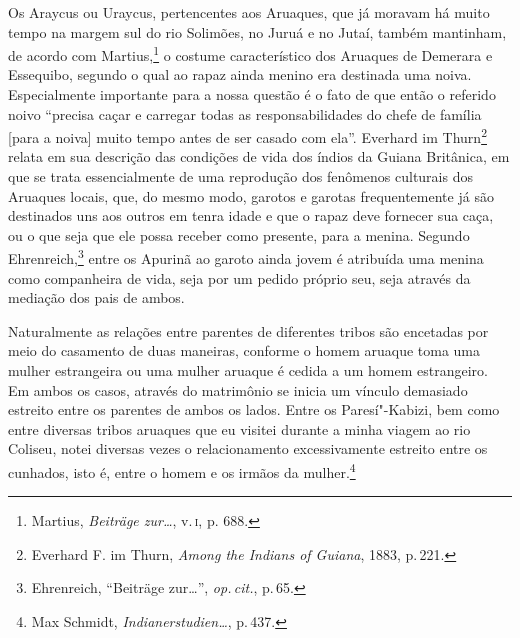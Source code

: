 Os Araycus ou Uraycus, pertencentes aos Aruaques, que já moravam há muito
tempo na margem sul do rio Solimões, no Juruá e no Jutaí, também
mantinham, de acordo com Martius,\footnote{Martius, \textit{Beiträge zur\ldots}, v.\,\textsc{i}, p.
  688.} o costume característico dos Aruaques de Demerara e Essequibo,
segundo o qual ao rapaz ainda menino era destinada uma noiva.
Especialmente importante para a nossa questão é o fato de que então o
referido noivo ``precisa caçar e carregar todas as responsabilidades do
chefe de família {[}para a noiva{]} muito tempo antes de ser casado com
ela''. Everhard im Thurn\footnote{Everhard F. im Thurn, \textit{Among the
  Indians of Guiana}, 1883, p.\,221.} relata em sua descrição das
condições de vida dos índios da Guiana Britânica, em que se trata
essencialmente de uma reprodução dos fenômenos culturais dos Aruaques
locais, que, do mesmo modo, garotos e garotas frequentemente já são
destinados uns aos outros em tenra idade e que o rapaz deve fornecer sua
caça, ou o que seja que ele possa receber como presente, para a menina.
Segundo Ehrenreich,\footnote{Ehrenreich, ``Beiträge zur\ldots'', \textit{op.\,cit.}, p.\,65.} entre os Apurinã ao garoto
ainda jovem é atribuída uma menina como companheira de vida, seja por um
pedido próprio seu, seja através da mediação dos pais de ambos.

Naturalmente as relações entre parentes de diferentes tribos são
encetadas por meio do casamento de duas maneiras, conforme o homem
aruaque toma uma mulher estrangeira ou uma mulher aruaque é cedida a um
homem estrangeiro. Em ambos os casos, através do matrimônio se inicia um
vínculo demasiado estreito entre os parentes de ambos os lados. Entre
os Paresí"-Kabizi, bem como entre diversas tribos aruaques que eu visitei
durante a minha viagem ao rio Coliseu, notei diversas vezes o
relacionamento excessivamente estreito entre os cunhados, isto é, entre
o homem e os irmãos da mulher.\footnote{Max Schmidt,
  \textit{Indianerstudien\ldots}, p.\,437.}

